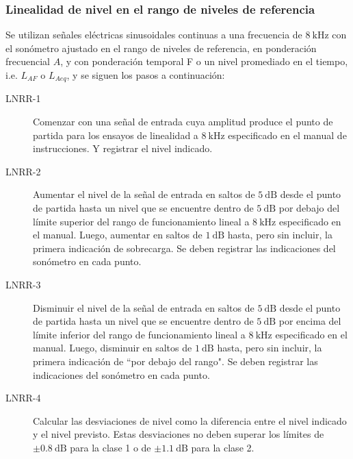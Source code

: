 \subsubsection{Linealidad de nivel en el rango de niveles de referencia}
Se utilizan señales eléctricas sinusoidales continuas a una frecuencia de $\qty{8}{\kHz}$ con el sonómetro ajustado en el rango de niveles de referencia, en ponderación frecuencial $A$, y con ponderación temporal F o un nivel promediado en el tiempo, i.e. $L_{AF}$ o $L_{Aeq}$, y se siguen los pasos a continuación:
%
\begin{description}
    \item[LNRR-1] Comenzar con una señal de entrada cuya amplitud produce el punto de partida para los ensayos de linealidad a $\qty{8}{\kHz}$ especificado en el manual de instrucciones.
    Y registrar el nivel indicado.

    \item[LNRR-2] Aumentar el nivel de la señal de entrada en saltos de $\qty{5}{\dB}$ desde el punto de partida hasta un nivel que se encuentre dentro de $\qty{5}{\dB}$ por debajo del límite superior del rango de funcionamiento lineal a $\qty{8}{\kHz}$ especificado en el manual.
    Luego, aumentar en saltos de $\qty{1}{\dB}$ hasta, pero sin incluir, la primera indicación de sobrecarga.
    Se deben registrar las indicaciones del sonómetro en cada punto.

    \item[LNRR-3] Disminuir el nivel de la señal de entrada en saltos de $\qty{5}{\dB}$ desde el punto de partida hasta un nivel que se encuentre dentro de $\qty{5}{\dB}$ por encima del límite inferior del rango de funcionamiento lineal a $\qty{8}{\kHz}$ especificado en el manual.
    Luego, disminuir en saltos de $\qty{1}{\dB}$ hasta, pero sin incluir, la primera indicación de ``por debajo del rango".
    Se deben registrar las indicaciones del sonómetro en cada punto.

    \item[LNRR-4] Calcular las desviaciones de nivel como la diferencia entre el nivel indicado y el nivel previsto.
    Estas desviaciones no deben superar los límites de $\pm\qty{0.8}{\dB}$ para la clase 1 o de $\pm\qty{1.1}{\dB}$ para la clase 2.
\end{description}

